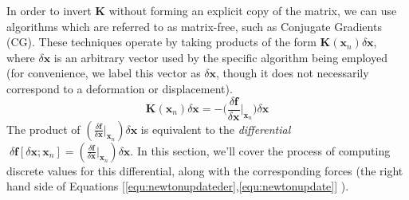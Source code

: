 In order to invert $\bm K$ without forming an explicit copy of the
matrix, we can use algorithms which are referred to as matrix-free,
such as Conjugate Gradients (CG). These techniques operate by taking
products of the form $\bm K(\bm x_n) \delta \bm x$, where $\delta \bm
x$ is an arbitrary vector used by the specific algorithm being
employed (for convenience, we label this vector as $\delta \bm x$,
though it does not necessarily correspond to a deformation or
displacement).
\begin{equation}
  \bm K(\bm x_n) \delta \bm x = -\bigg(\frac{\delta \bm f}{\delta \bm
    x}\bigg|_{\bm x_n}\bigg)\delta \bm x
\end{equation}
The product of $(\frac{\delta \bm f}{\delta \bm
    x}|_{\bm x_n})\delta \bm x$ is  equivalent to the
  \textit{differential} $\;\delta \bm f [ \delta \bm x; \bm x_n ] = (\frac{\delta \bm f}{\delta \bm
    x}|_{\bm x_n})\delta \bm x$. In this section, we'll cover the
  process of computing discrete values for this differential, along
  with the corresponding forces (the right
  hand side of Equations
  [\ref{equ:newtonupdateder},\ref{equ:newtonupdate}] ).


